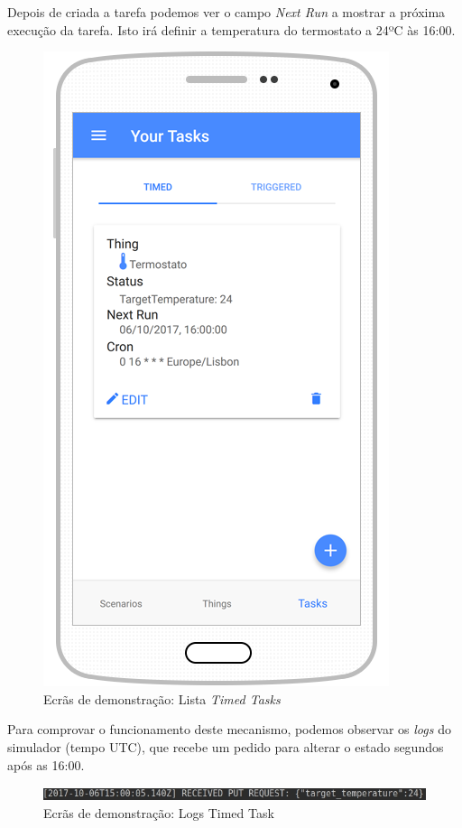 Depois de criada a tarefa podemos ver o campo \textit{Next Run} a mostrar a próxima execução da tarefa. Isto irá definir a temperatura do termostato a 24ºC às 16:00.

\begin{figure}[H]
  \centering
        \includegraphics[scale=0.75]{img/demo/show_timed_task.png}
  \caption{Ecrãs de demonstração: Lista \textit{Timed Tasks}}
\end{figure}

Para comprovar o funcionamento deste mecanismo, podemos observar os \textit{logs} do simulador (tempo UTC), que recebe um pedido para alterar o estado segundos após as 16:00.

\begin{figure}[H]
  \centering
        \includegraphics[scale=0.6]{img/demo/timed_task_log.jpg}
  \caption{Ecrãs de demonstração: Logs {Timed Task}}
\end{figure}

